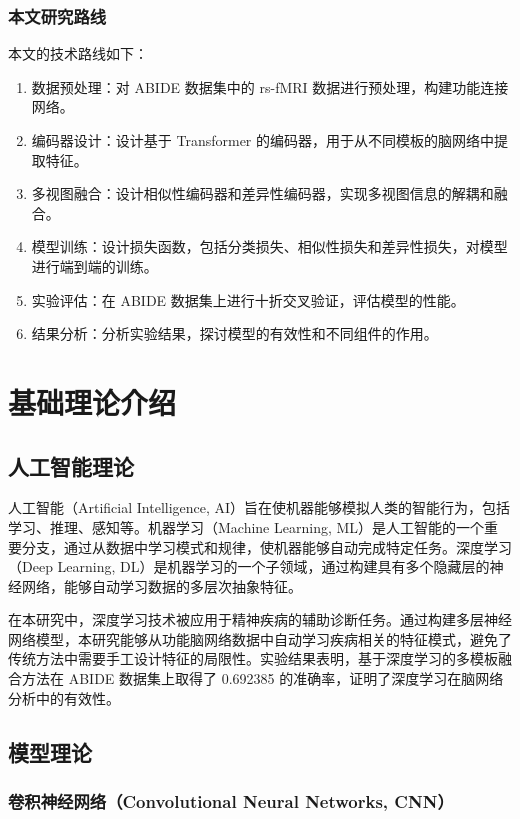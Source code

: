 \documentclass[12pt,a4paper]{article}
\begin{document}
\subsubsection{本文研究路线}

本文的技术路线如下：

\begin{enumerate}
\item 数据预处理：对 ABIDE 数据集中的 rs-fMRI 数据进行预处理，构建功能连接网络。
\item 编码器设计：设计基于 Transformer 的编码器，用于从不同模板的脑网络中提取特征。
\item 多视图融合：设计相似性编码器和差异性编码器，实现多视图信息的解耦和融合。
\item 模型训练：设计损失函数，包括分类损失、相似性损失和差异性损失，对模型进行端到端的训练。
\item 实验评估：在 ABIDE 数据集上进行十折交叉验证，评估模型的性能。
\item 结果分析：分析实验结果，探讨模型的有效性和不同组件的作用。
\end{enumerate}

\section{基础理论介绍}

\subsection{人工智能理论}

人工智能（Artificial Intelligence, AI）旨在使机器能够模拟人类的智能行为，包括学习、推理、感知等。机器学习（Machine Learning, ML）是人工智能的一个重要分支，通过从数据中学习模式和规律，使机器能够自动完成特定任务。深度学习（Deep Learning, DL）是机器学习的一个子领域，通过构建具有多个隐藏层的神经网络，能够自动学习数据的多层次抽象特征。

在本研究中，深度学习技术被应用于精神疾病的辅助诊断任务。通过构建多层神经网络模型，本研究能够从功能脑网络数据中自动学习疾病相关的特征模式，避免了传统方法中需要手工设计特征的局限性。实验结果表明，基于深度学习的多模板融合方法在 ABIDE 数据集上取得了 0.692385 的准确率，证明了深度学习在脑网络分析中的有效性。

\subsection{模型理论}

\subsubsection{卷积神经网络（Convolutional Neural Networks, CNN）}
\end{document}
